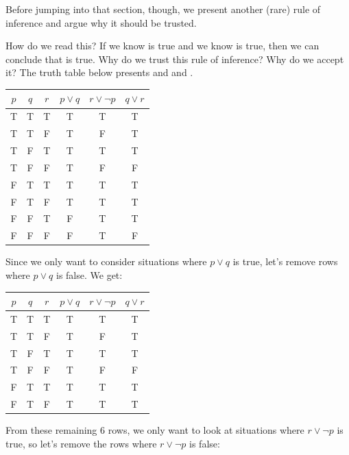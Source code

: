 \documentclass{book}
\theoremstyle{ekimcustom}
\begin{document}
Before jumping into that section, though, we present another (rare) rule of inference and argue why it should be trusted.
\begin{center}
\end{center}
How do we read this? If we know  is true and we know  is true, then we can conclude that  is true. Why do we trust this rule of inference? Why do we accept it? The truth table below presents  and   and .
\begin{center}
\begin{tabular}{c|c|c||c|c|c}
$p$ & $q$ & $r$ & $p \vee q$ & $r \vee \neg p$ & $q \vee r$ \\\hline
T & T & T & T& T & T \\
T & T & F & T& F& T\\
T & F & T & T& T& T \\
T & F & F & T& F& F\\
F & T & T & T& T& T\\
F & T & F & T& T& T\\
F & F & T & F& T & T\\
F & F & F & F & T& F
\end{tabular}
\end{center}
Since we only want to consider situations where $p \vee q$ is true, let's remove rows where $p \vee q$ is false. We get:
\begin{center}
\begin{tabular}{c|c|c||c|c|c}
$p$ & $q$ & $r$ & $p \vee q$ & $r \vee \neg p$ & $q \vee r$ \\\hline
T & T & T & T& T & T \\
T & T & F & T& F& T\\
T & F & T & T& T& T \\
T & F & F & T& F& F\\
F & T & T & T& T& T\\
F & T & F & T& T& T
\end{tabular}
\end{center}
From these remaining $6$ rows, we only want to look at situations where $r \vee \neg p$ is true, so let's remove the rows where $r \vee \neg p$ is false:
\end{document}
